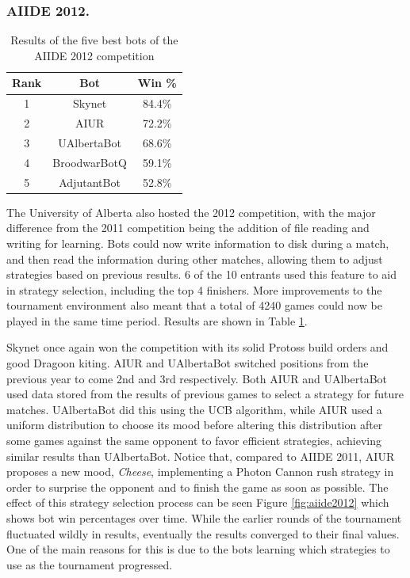 \documentclass{llncs}
\begin{document}
\subsubsection{AIIDE 2012.}

\begin{table}[!t]
\caption{Results of the five best bots of the AIIDE 2012 competition}
\label{tab:aiide2012}
\centering
\begin{tabular}{|c|c|c|}
\hline
{\bfseries Rank} & {\bfseries Bot} & {\bfseries Win \%} \\
\hline
1 & Skynet & 84.4\% \\
2 & AIUR & 72.2\% \\
3 & UAlbertaBot & 68.6\% \\
4 & BroodwarBotQ & 59.1\% \\
5 & AdjutantBot & 52.8\% \\
\hline
\end{tabular}
\end{table}

The University of Alberta also hosted the 2012 competition, with the major difference from the 2011
competition being the addition of file reading and writing for learning. Bots could now write information to disk during a
match, and then read the information during other matches, allowing them to adjust strategies based
on previous results. 6 of the 10 entrants used this feature to aid in strategy selection, including the
top 4 finishers. More improvements to the tournament environment also meant that a total of 4240 games
could now be played in the same time period. Results are shown in Table \ref{tab:aiide2012}.

Skynet once  again won  the competition with  its solid  Protoss build
orders  and  good  Dragoon  kiting.   AIUR  and  UAlbertaBot  switched
positions from  the previous  year to come  2nd and  3rd respectively.
Both  AIUR  and UAlbertaBot  used  data  stored  from the  results  of
previous games  to select a strategy for  future matches.  UAlbertaBot
did  this  using  the  UCB  \cite{auer2002finite} algorithm,  while  AIUR  used  a  uniform
distribution  to choose  its  mood before  altering this  distribution
after  some  games  against  the  same  opponent  to  favor  efficient
strategies, achieving  similar results than  UAlbertaBot. Notice that,
compared  to AIIDE 2011,  AIUR proposes  a new  mood, \textit{Cheese},
implementing a  Photon Cannon rush  strategy in order to  surprise the
opponent and  to finish the game  as soon as possible.   The effect of
this strategy selection process can be seen Figure \ref{fig:aiide2012}
which shows bot  win percentages over time.  While  the earlier rounds
of the tournament fluctuated wildly in results, eventually the results
converged to their  final values. One of the main  reasons for this is
due to  the bots  learning which strategies  to use as  the tournament
progressed.
\end{document}
